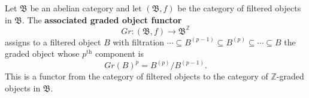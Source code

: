 Let $\mathfrak{B}$ be an abelian category and let $(\mathfrak{B}, f)$ be the category of filtered objects in $\mathfrak{B}$. The \textbf{associated graded object functor}
$$
Gr : (\mathfrak{B}, f) \to \mathfrak{B}^{\mathbb{Z}}
$$
assigns to a filtered object $B$ with filtration $\cdots \subseteq B^{(p-1)} \subseteq B^{(p)} \subseteq \cdots \subseteq B$ the graded object whose $p^{\text{th}}$ component is
$$
Gr(B)^p = B^{(p)} / B^{(p-1)}.
$$
This is a functor from the category of filtered objects to the category of $\mathbb{Z}$-graded objects in $\mathfrak{B}$.
